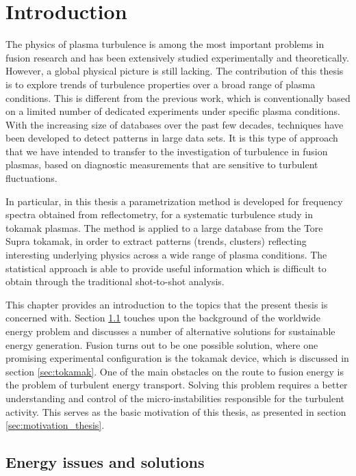 
\chapter{Introduction} \label{ch:Introduction}
\graphicspath{{chapter1_ys/}}
\minitoc


The physics of plasma turbulence is among the most important problems in fusion research and has been extensively studied experimentally and theoretically. However, a global physical picture is still lacking. The contribution of this thesis is to explore trends of turbulence properties over a broad range of plasma conditions. This is different from the previous work, which is conventionally based on a limited number of dedicated experiments under specific plasma conditions. With the increasing size of databases over the past few decades, techniques have been developed to detect patterns in large data sets. It is this type of approach that we have intended to transfer to the investigation of turbulence in fusion plasmas, based on diagnostic measurements that are sensitive to turbulent fluctuations.

In particular, in this thesis a parametrization method is developed for frequency spectra obtained from reflectometry, for a systematic turbulence study in tokamak plasmas. The method is applied to a large database from the Tore Supra tokamak, in order to extract patterns (trends, clusters) reflecting interesting underlying physics across a wide range of plasma conditions. The statistical approach is able to provide useful information which is difficult to obtain through the traditional shot-to-shot analysis.

This chapter provides an introduction to the topics that the present thesis is concerned with. Section \ref{sec:energy_issues} touches upon the background of the worldwide energy problem and discusses a number of alternative solutions for sustainable energy generation. Fusion turns out to be one possible solution, where one promising experimental configuration is the tokamak device, which is discussed in section \ref{sec:tokamak}. One of the main obstacles on the route to fusion energy is the problem of turbulent energy transport. Solving this problem requires a better understanding and control of the micro-instabilities responsible for the turbulent activity. This serves as the basic motivation of this thesis, as presented in section \ref{sec:motivation_thesis}.


\section{Energy issues and solutions} \label{sec:energy_issues}


